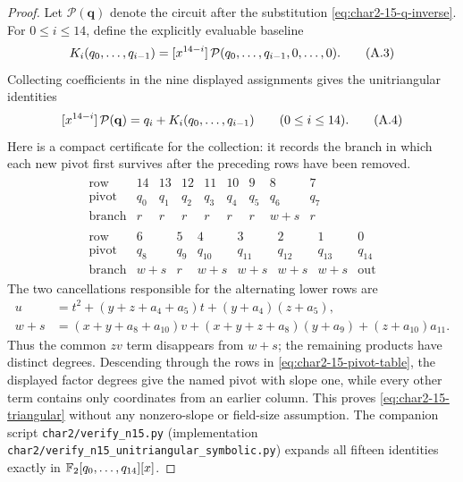 \begin{proof}
Let $\mathcal P(\mathbf q)$ denote the circuit after the substitution
\eqref{eq:char2-15-q-inverse}.  For $0\le i\le14$, define the explicitly
evaluable baseline
\[
 K_i(q_0,\ldots,q_{i-1})
 =\coeff{\mathcal P(q_0,\ldots,q_{i-1},0,\ldots,0)}{14-i}.
                                                                    \tag{A.3}\label{eq:char2-15-baseline}
\]
Collecting coefficients in the nine displayed assignments gives the
unitriangular identities
\[
 \coeff{\mathcal P(\mathbf q)}{14-i}
   =q_i+K_i(q_0,\ldots,q_{i-1})
   \qquad(0\le i\le14).                                           \tag{A.4}\label{eq:char2-15-triangular}
\]
Here is a compact certificate for the collection: it records the branch in
which each new pivot first survives after the preceding rows have been
removed.
\[
\begin{gathered}
\begin{array}{c|rrrrrrrr}
\text{row}&14&13&12&11&10&9&8&7\\ \hline
\text{pivot}&q_0&q_1&q_2&q_3&q_4&q_5&q_6&q_7\\
\text{branch}&r&r&r&r&r&r&w+s&r
\end{array}\\[3pt]
\begin{array}{c|rrrrrrr}
\text{row}&6&5&4&3&2&1&0\\ \hline
\text{pivot}&q_8&q_9&q_{10}&q_{11}&q_{12}&q_{13}&q_{14}\\
\text{branch}&w+s&r&w+s&w+s&w+s&w+s&\mathrm{out}
\end{array}
\end{gathered}                                                    \tag{A.5}\label{eq:char2-15-pivot-table}
\]
The two cancellations responsible for the alternating lower rows are
\[
\begin{aligned}
u&=t^2+(y+z+a_4+a_5)t+(y+a_4)(z+a_5),\\
w+s&=(x+y+a_8+a_{10})v
 +(x+y+z+a_8)(y+a_9)+(z+a_{10})a_{11}.
\end{aligned}                                                     \tag{A.6}
\]
Thus the common $zv$ term disappears from $w+s$; the remaining products have
distinct degrees.  Descending through the rows in
\eqref{eq:char2-15-pivot-table}, the displayed
factor degrees give the named pivot with slope one, while every other term
contains only coordinates from an earlier column.  This proves
\eqref{eq:char2-15-triangular}
without any nonzero-slope or field-size assumption.  The companion script
\texttt{char2/verify\_n15.py} (implementation
\texttt{char2/verify\_n15\_unitriangular\_symbolic.py}) expands all fifteen
identities exactly in $\F_2[q_0,\ldots,q_{14}][x]$.


\end{proof}
